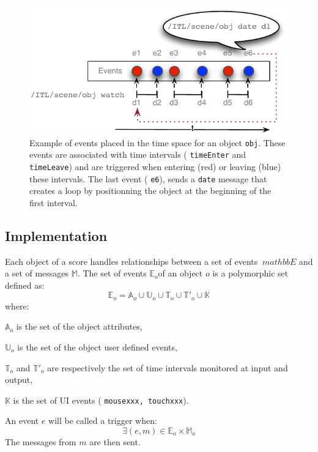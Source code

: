 \documentclass{article}
\newcommand{\OSC}[1]	{{\fontsize{9pt}{9pt} \selectfont\texttt{#1}}}
\let\olditemize\itemize
\let\oldenditemize\enditemize
\renewenvironment{itemize} 	{\olditemize \renewcommand{\labelitemi}{$\bullet$} \setlength{\itemsep}{0mm}}{\oldenditemize}
\begin{document}
\begin{figure}[h]
   \centering
   \includegraphics[width=0.95\columnwidth]{imgs/events}
   \caption{Example of events placed in the time space for an object \OSC{obj}. These events are associated with time intervals (\OSC{timeEnter} and \OSC{timeLeave}) and are triggered when entering (red) or leaving (blue) these intervals. The last event (\OSC{e6}), sends a \OSC{date} message that creates a loop by positionning the object at the beginning of the first interval.}
   \label{fig:events}
\end{figure}


\subsection{Implementation}

Each object of a score handles relationships between a set of events $\ mathbb{E}$ and a set of messages $\mathbb{M}$. The set of events $\mathbb{E}_o$of an object $o$ is a polymorphic set defined as:
\[
	\mathbb{E}_o = \mathbb{A}_o \cup \mathbb{U}_o \cup \mathbb{T}_o \cup \mathbb{T'}_o \cup \mathbb{K}  
\] 
where:
\begin{itemize}
\item[-] $\mathbb{A}_o$ is the set of the object attributes, 
\item[-] $\mathbb{U}_o$ is the set of the object user defined events, 
\item[-] $\mathbb{T}_o$ and $\mathbb{T'}_o$ are respectively the set of time intervals monitored at input and output,
\item[-] $\mathbb{K}$ is the set of UI events (\OSC{mousexxx, touchxxx}).
\end{itemize}

An event $e$ will be called a trigger when:
\[
	\exists (e, m) \in \mathbb{E}_o \times \mathbb{M}_o  
\] 
The messages from $m$ are then sent.
\end{document}
